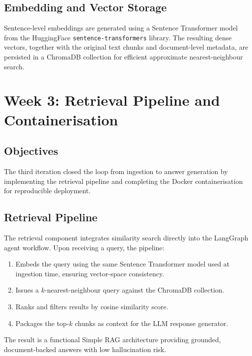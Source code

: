 \documentclass[12pt, a4paper]{article}
\begin{document}
\subsection{Embedding and Vector Storage}

Sentence-level embeddings are generated using a Sentence Transformer
model from the HuggingFace \texttt{sentence-transformers} library.
The resulting dense vectors, together with the original text chunks
and document-level metadata, are persisted in a ChromaDB collection
for efficient approximate nearest-neighbour search.

\section{Week 3: Retrieval Pipeline and Containerisation}
\label{sec:week3}

\subsection{Objectives}

The third iteration closed the loop from ingestion to answer generation
by implementing the retrieval pipeline and completing the Docker
containerisation for reproducible deployment.

\subsection{Retrieval Pipeline}

The retrieval component integrates similarity search directly into the
LangGraph agent workflow. Upon receiving a query, the pipeline:

\begin{enumerate}[leftmargin=*, label=\textbf{\arabic*.}]
    \item Embeds the query using the same Sentence Transformer model used
          at ingestion time, ensuring vector-space consistency.
    \item Issues a $k$-nearest-neighbour query against the ChromaDB
          collection.
    \item Ranks and filters results by cosine similarity score.
    \item Packages the top-$k$ chunks as context for the LLM response
          generator.
\end{enumerate}

The result is a functional Simple RAG architecture \cite{lewis2020rag}
providing grounded, document-backed answers with low hallucination risk.
\end{document}
